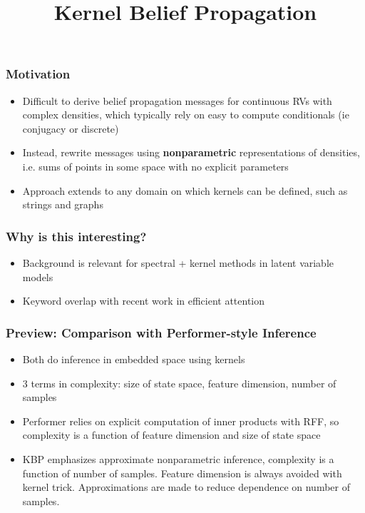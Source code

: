 \documentclass{beamer}
\title{Kernel Belief Propagation}
\begin{document}
 
\frame{\titlepage}
 
\begin{frame}
\frametitle{Motivation}
\begin{itemize}
\item Difficult to derive belief propagation messages for continuous RVs
    with complex densities, which typically rely on easy to compute conditionals
    (ie conjugacy or discrete)
\vspace{1em}
\item Instead, rewrite messages using \textbf{nonparametric} representations
of densities, i.e. sums of points in some space with no explicit parameters
\vspace{1em}
\item Approach extends to any domain on which kernels can be defined,
such as strings and graphs
\end{itemize}
\end{frame}

\begin{frame}
\frametitle{Why is this interesting?}
\begin{itemize}
\item Background is relevant for spectral + kernel methods in latent variable models 
\vspace{2em}
\item Keyword overlap with recent work in efficient attention
\end{itemize}
\end{frame}

\begin{frame}
\frametitle{Preview: Comparison with Performer-style Inference}
\begin{itemize}
\item Both do inference in embedded space using kernels
\vspace{1em}
\item 3 terms in complexity: size of state space, feature dimension, number of samples
\vspace{1em}
\item Performer relies on explicit computation of inner products with RFF,
    so complexity is a function of feature dimension and size of state space
\vspace{1em}
\item KBP emphasizes approximate nonparametric inference, complexity is a
    function of number of samples.
    Feature dimension is always avoided with kernel trick.
    Approximations are made to reduce dependence on number of samples.
\end{itemize}
\end{frame}
\end{document}
